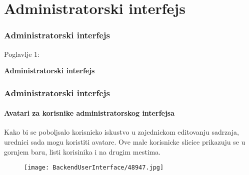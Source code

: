 %

\section{Administratorski interfejs}
\begin{frame}[fragile]
	\frametitle{Administratorski interfejs}

	\begin{center}\huge{Poglavlje 1:}\end{center}
	\begin{center}\huge{\color{typo3darkgrey}\textbf{Administratorski interfejs}}\end{center}

\end{frame}

\begin{frame}[fragile]
	\frametitle{Administratorski interfejs}
	\framesubtitle{Avatari za korisnike administratorskog interfejsa}

	Kako bi se poboljsalo korisnicko iskustvo u zajednickom editovanju sadrzaja, urednici sada mogu koristiti avatare. Ove male korisnicke slicice prikazuju se u gornjem baru, listi korisinika i na drugim mestima.

	\begin{figure}
		\texttt{[image: BackendUserInterface/48947.jpg]}
	\end{figure}

\end{frame}

